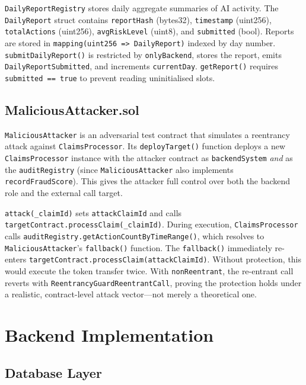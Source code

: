 \documentclass[12pt,a4paper]{article}
\begin{document}
\texttt{DailyReportRegistry} stores daily aggregate summaries of AI
activity. The \texttt{DailyReport} struct contains \texttt{reportHash}
(bytes32), \texttt{timestamp} (uint256), \texttt{totalActions}
(uint256), \texttt{avgRiskLevel} (uint8), and \texttt{submitted} (bool).
Reports are stored in \texttt{mapping(uint256 => DailyReport)} indexed
by day number. \texttt{submitDailyReport()} is restricted by
\texttt{onlyBackend}, stores the report, emits
\texttt{DailyReportSubmitted}, and increments \texttt{currentDay}.
\texttt{getReport()} requires \texttt{submitted == true} to prevent
reading uninitialised slots.

\subsection{MaliciousAttacker.sol}
\label{sec:malicious-attacker}

\texttt{MaliciousAttacker} is an adversarial test contract that
simulates a reentrancy attack against \texttt{ClaimsProcessor}.
Its \texttt{deployTarget()} function deploys a new
\texttt{ClaimsProcessor} instance with the attacker contract as
\texttt{backendSystem} \emph{and} as the \texttt{auditRegistry}
(since \texttt{MaliciousAttacker} also implements
\texttt{recordFraudScore}). This gives the attacker full control over
both the backend role and the external call target.

\texttt{attack(\_claimId)} sets \texttt{attackClaimId} and calls
\texttt{targetContract.processClaim(\_claimId)}. During execution,
\texttt{ClaimsProcessor} calls \texttt{auditRegistry.getActionCountByTimeRange()},
which resolves to \texttt{MaliciousAttacker}'s \texttt{fallback()}
function. The \texttt{fallback()} immediately re-enters
\texttt{targetContract.processClaim(attackClaimId)}. Without protection,
this would execute the token transfer twice. With \texttt{nonReentrant},
the re-entrant call reverts with \texttt{ReentrancyGuardReentrantCall},
proving the protection holds under a realistic, contract-level attack
vector---not merely a theoretical one.


\section{Backend Implementation}
\label{sec:backend}

\subsection{Database Layer}
\label{sec:database}
\end{document}
